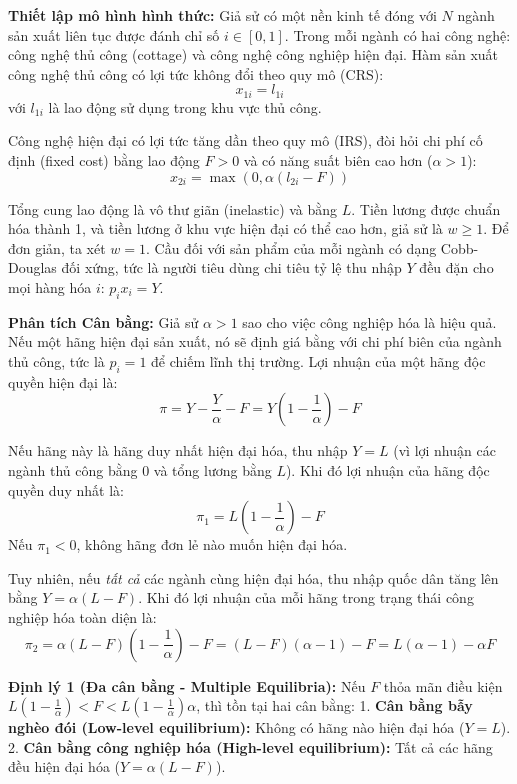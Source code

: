 \documentclass[
]{article}
\begin{document}
\textbf{Thiết lập mô hình hình thức:} Giả sử có một nền kinh tế đóng với
\(N\) ngành sản xuất liên tục được đánh chỉ số \(i \in [0, 1]\). Trong
mỗi ngành có hai công nghệ: công nghệ thủ công (cottage) và công nghệ
công nghiệp hiện đại. Hàm sản xuất công nghệ thủ công có lợi tức không
đổi theo quy mô (CRS): \[ x_{1i} = l_{1i} \] với \(l_{1i}\) là lao động
sử dụng trong khu vực thủ công.

Công nghệ hiện đại có lợi tức tăng dần theo quy mô (IRS), đòi hỏi chi
phí cố định (fixed cost) bằng lao động \(F > 0\) và có năng suất biên
cao hơn (\(\alpha > 1\)): \[ x_{2i} = \max(0, \alpha(l_{2i} - F)) \]

Tổng cung lao động là vô thư giãn (inelastic) và bằng \(L\). Tiền lương
được chuẩn hóa thành 1, và tiền lương ở khu vực hiện đại có thể cao hơn,
giả sử là \(w \geq 1\). Để đơn giản, ta xét \(w=1\). Cầu đối với sản
phẩm của mỗi ngành có dạng Cobb-Douglas đối xứng, tức là người tiêu dùng
chi tiêu tỷ lệ thu nhập \(Y\) đều đặn cho mọi hàng hóa \(i\):
\(p_i x_i = Y\).

\textbf{Phân tích Cân bằng:} Giả sử \(\alpha > 1\) sao cho việc công
nghiệp hóa là hiệu quả. Nếu một hãng hiện đại sản xuất, nó sẽ định giá
bằng với chi phí biên của ngành thủ công, tức là \(p_i = 1\) để chiếm
lĩnh thị trường. Lợi nhuận của một hãng độc quyền hiện đại là:
\[ \pi = Y - \frac{Y}{\alpha} - F = Y\left(1 - \frac{1}{\alpha}\right) - F \]

Nếu hãng này là hãng duy nhất hiện đại hóa, thu nhập \(Y = L\) (vì lợi
nhuận các ngành thủ công bằng 0 và tổng lương bằng \(L\)). Khi đó lợi
nhuận của hãng độc quyền duy nhất là:
\[ \pi_1 = L\left(1 - \frac{1}{\alpha}\right) - F \] Nếu \(\pi_1 < 0\),
không hãng đơn lẻ nào muốn hiện đại hóa.

Tuy nhiên, nếu \emph{tất cả} các ngành cùng hiện đại hóa, thu nhập quốc
dân tăng lên bằng \(Y = \alpha(L - F)\). Khi đó lợi nhuận của mỗi hãng
trong trạng thái công nghiệp hóa toàn diện là:
\[ \pi_2 = \alpha(L - F) \left(1 - \frac{1}{\alpha}\right) - F = (L - F)(\alpha - 1) - F = L(\alpha - 1) - \alpha F \]

\textbf{Định lý 1 (Đa cân bằng - Multiple Equilibria):} Nếu \(F\) thỏa
mãn điều kiện
\(L\left(1 - \frac{1}{\alpha}\right) < F < L\left(1 - \frac{1}{\alpha}\right) \alpha\),
thì tồn tại hai cân bằng: 1. \textbf{Cân bằng bẫy nghèo đói (Low-level
equilibrium):} Không có hãng nào hiện đại hóa (\(Y = L\)). 2.
\textbf{Cân bằng công nghiệp hóa (High-level equilibrium):} Tất cả các
hãng đều hiện đại hóa (\(Y = \alpha(L - F)\)).
\end{document}
